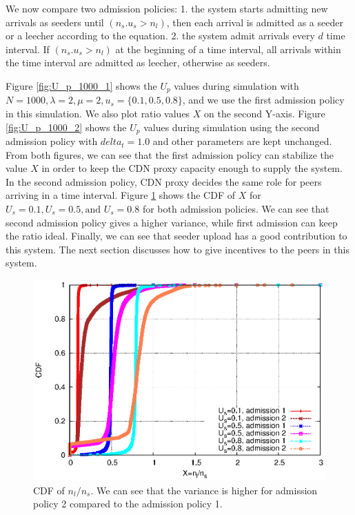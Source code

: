 \documentclass[paper]{ieice}
\begin{document}
We now compare two admission policies:
1. the system starts admitting new arrivals as seeders until $(n_s.u_s > n_l)$, then each arrival is admitted as a seeder or a leecher according to the equation.     
2. the system admit arrivals every $d$ time interval. If $(n_s.u_s > n_l)$ at the beginning of a time interval, all arrivals within the time interval are admitted as leecher, otherwise as seeders.

Figure \ref{fig:U_p_1000_1} shows the $U_p$ values during simulation with $N=1000, \lambda=2, \mu=2, u_s=\{0.1, 0.5, 0.8\}$, and we use the first admission policy in this simulation. 
We also plot ratio values $X$ on the second Y-axis.
Figure \ref{fig:U_p_1000_2} shows the $U_p$ values during simulation using the second admission policy with $delta_t=1.0$ and other parameters are kept unchanged.  
From both figures, we can see that the first admission policy can stabilize the value $X$ in order to keep the CDN proxy capacity enough to supply the system. 
In the second admission policy, CDN proxy decides the same role for peers arriving in a time interval.
Figure \ref{fig:cdf} shows the CDF of $X$ for $U_s=0.1, U_s=0.5, \text{and }  U_s=0.8$ for both admission policies. 
We can see that second admission policy gives a higher variance, while first admission can keep the ratio ideal.
Finally, we can see that seeder upload has a good contribution to this system. 
The next section discusses how to give incentives to the peers in this system.

\begin{figure}[hb] 
\begin{center}
\includegraphics[scale=0.6]{graphs/cdf.eps}
\end{center}
\caption{CDF of $n_l/n_s$. We can see that the variance is higher for admission policy 2 compared to the admission policy 1.}
\label{fig:cdf}
\vspace{-2mm}
\end{figure}
 
\end{document}
